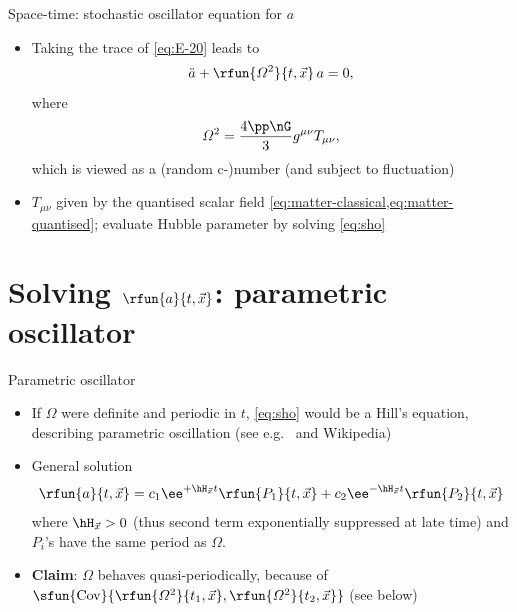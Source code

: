 \documentclass{beamer}
\begin{document}



\begin{frame}{Space-time: stochastic oscillator equation for $a$}
\begin{itemize}
\item Taking the trace of \cref{eq:E-20} leads to
\begin{equation}
\ddot a + \rfun{\varOmega^2}{t,\vec x}\, a = 0,
\label{eq:sho}
\end{equation}
where
\begin{equation}
\varOmega^2 = \frac{4\pp\nG}{3} g^{\mu\nu} T_{\mu\nu},
\end{equation}
which is viewed as a (random c-)number (and subject to fluctuation)

\item $T_{\mu\nu}$ given by the quantised scalar field 
\cref{eq:matter-classical,eq:matter-quantised}; evaluate Hubble parameter by 
solving \cref{eq:sho}
\end{itemize}


\end{frame}

\section{Solving $\rfun{a}{t,\vec{x}}$: parametric oscillator}

\begin{frame}{Parametric oscillator}
\begin{itemize}
\item If $\varOmega$ were definite and periodic in $t$, \cref{eq:sho} would be 
a Hill's equation, describing \alert{parametric oscillation} (see e.g.\ 
\cite[§27]{Landau1976} and Wikipedia)
\item General solution
\begin{equation}
\rfun{a}{t,\vec x} = c_1 \ee^{+\hH_{\vec x}t}\rfun{P_1}{t,\vec x}
+ c_2 \ee^{-\hH_{\vec x}t}\rfun{P_2}{t,\vec x}
\end{equation}
where $\hH_{\vec x} > 0$ (thus second term exponentially suppressed at late 
time) and $P_i$'s have the same period as $\varOmega$.
\item \textbf{Claim}: $\varOmega$ behaves \alert{quasi-periodically}, because 
of $\sfun{\mathrm{Cov}}{\rfun{\varOmega^2}{t_1, \vec x}, 
\rfun{\varOmega^2}{t_2, \vec x}}$ (see below)

\end{itemize}


\end{frame}
\end{document}
